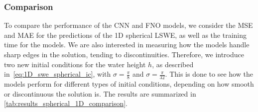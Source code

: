 \subsubsection*{Comparison}
To compare the performance of the CNN and FNO models, we consider the MSE and MAE for the predictions of the 1D spherical LSWE, as well as the training time for the models.
We are also interested in measuring how the models handle sharp edges in the solution, tending to discontinuities.
Therefore, we introduce two new initial conditions for the water height $h$, as described in~\eqref{eq:1D_swe_spherical_ic}, with $\sigma = \frac{\pi}{8}$ and $\sigma = \frac{\pi}{32}$.
This is done to see how the models perform for different types of initial conditions, depending on how smooth or discontinuous the solution is.
The results are summarized in \autoref{tab:results_spherical_1D_comparison}.
